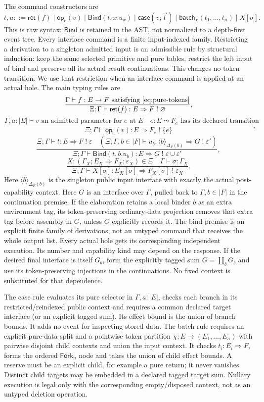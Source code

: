 \documentclass[11pt,a4paper]{article}
\theoremstyle{definition}
\newcommand{\Ret}{\mathsf{ret}}
\newcommand{\Bind}{\mathsf{Bind}}
\newcommand{\Op}{\mathsf{op}}
\newcommand{\Batch}{\mathsf{batch}}
\begin{document}
The command constructors are
\[
 t,u ::= \Ret(f)\mid\Op_e(v)\mid\Bind(t,x.u_x)
       \mid\mathsf{case}(v;\vec t)
       \mid\Batch_\chi(t_1,\ldots,t_n)\mid X[\sigma].
\]
This is raw syntax: $\Bind$ is retained in the AST, not normalized to a
depth-first event tree. Every interface command is a finite input-indexed
family. Restricting a derivation to a singleton admitted input is an
admissible rule by structural induction: keep the same selected primitive
and pure tables, restrict the left input of bind and preserve all its
actual result continuations. This changes no token transition. We use
that restriction when an interface command is applied at an actual hole.
The main typing rules are
\[
 \frac{\Gamma\vdash f:E\to F\text{ satisfying }\eqref{eq:pure-tokens}}
 {\Xi;\Gamma\vdash\Ret(f):E\Rightarrow F\;!\;\varnothing},
\]
\[
 \frac{\Gamma,a:|E|\vdash v\text{ an admitted parameter for }e\text{ at }E
       \quad e:E\leadsto F_e\text{ has its declared transition}}
 {\Xi;\Gamma\vdash\Op_e(v):E\Rightarrow F_e\;!\;\{e\}},
\]
\[
 \frac{\Xi;\Gamma\vdash t:E\Rightarrow F\;!\;\varepsilon
 \quad(\Xi;\Gamma,b\in|F|\vdash
       u_b:\langle b\rangle_{\Delta_F(b)}\Rightarrow G\;!\;\varepsilon')}
 {\Xi;\Gamma\vdash\Bind(t,b.u_b):E\Rightarrow G
          \;!\;\varepsilon\cup\varepsilon'},
\]
\[
 \frac{X:(\Gamma_X;E_X\Rightarrow F_X;\varepsilon_X)\in\Xi
          \quad\Gamma\vdash\sigma:\Gamma_X}
 {\Xi;\Gamma\vdash X[\sigma]:E_X[\sigma]\Rightarrow F_X[\sigma]
          \;!\;\varepsilon_X}.
\]
Here $\langle b\rangle_{\Delta_F(b)}$ is the singleton public input
interface with exactly the actual post-capability context. Here $G$ is an
interface over $\Gamma$, pulled back to $\Gamma,b\in|F|$ in the
continuation premise. If the elaboration retains a local binder $b$ as an
extra environment tag, its token-preserving ordinary-data projection
removes that extra tag before assembly in $G$, unless $G$ explicitly
records it. The bind premise
is an explicit finite family of derivations, not an untyped command that
receives the whole output list. Every actual hole gets its corresponding
independent execution. Its number and capability kind may depend on the
response. If the desired final interface is itself $G_b$, form the explicitly
tagged sum $G=\coprod_bG_b$ and use its token-preserving injections in the
continuations. No fixed context is substituted for that dependence.

The case rule evaluates its pure selector in $\Gamma,a:|E|$, checks each branch in its
restricted/reindexed public context and requires a common declared target
interface (or an explicit tagged sum). Its effect bound is the union of
branch bounds. It adds no event for inspecting stored data. The batch rule
requires an explicit pure-data split and a pointwise token partition
$\chi:E\to(E_1,\ldots,E_n)$ with pairwise disjoint child contexts and union
the input context. It checks $t_i:E_i\Rightarrow F$, forms the ordered
$\mathsf{Fork}_n$ node and takes the union of child effect bounds. A reserve
must be an explicit child, for example a pure return; it never vanishes.
Distinct child targets may be embedded in a declared tagged target sum.
Nullary execution is legal only with the corresponding empty/disposed
context, not as an untyped deletion operation.
\end{document}
